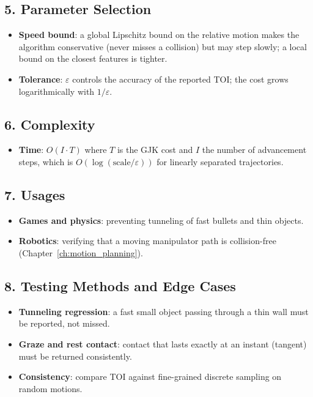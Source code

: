 \subsection{5. Parameter Selection}

\begin{itemize}
\item \textbf{Speed bound}: a global Lipschitz bound on the relative motion
  makes the algorithm conservative (never misses a collision) but may step
  slowly; a local bound on the closest features is tighter.
\item \textbf{Tolerance}: $\varepsilon$ controls the accuracy of the
  reported TOI; the cost grows logarithmically with $1/\varepsilon$.
\end{itemize}

\subsection{6. Complexity}

\begin{itemize}
\item \textbf{Time}: $O(I \cdot T)$ where $T$ is the GJK cost and $I$ the
  number of advancement steps, which is $O(\log(\text{scale}/\varepsilon))$
  for linearly separated trajectories.
\end{itemize}

\subsection{7. Usages}

\begin{itemize}
\item \textbf{Games and physics}: preventing tunneling of fast bullets and
  thin objects.
\item \textbf{Robotics}: verifying that a moving manipulator path is
  collision-free (Chapter~\ref{ch:motion_planning}).
\end{itemize}

\subsection{8. Testing Methods and Edge Cases}

\begin{itemize}
\item \textbf{Tunneling regression}: a fast small object passing through a
  thin wall must be reported, not missed.
\item \textbf{Graze and rest contact}: contact that lasts exactly at an
  instant (tangent) must be returned consistently.
\item \textbf{Consistency}: compare TOI against fine-grained discrete
  sampling on random motions.
\end{itemize}

